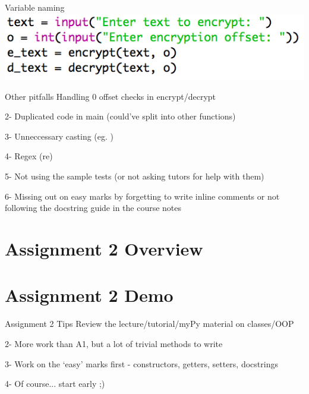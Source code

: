\documentclass[week2]{csse1001}
\begin{document}
\begin{topic}{Variable naming}
\includegraphics[width=\textwidth]{a1pitfalls/vname}
\end{topic}

\begin{topic}{Other pitfalls}
Handling 0 offset checks in encrypt/decrypt

\begin{subtopic}{2-}
Duplicated code in main (could've split into other functions)
\end{subtopic}

\begin{subtopic}{3-}
Unneccessary casting (eg. )
\end{subtopic}

\begin{subtopic}{4-}
Regex (re)
\end{subtopic}

\begin{subtopic}{5-}
Not using the sample tests (or not asking tutors for help with them)
\end{subtopic}

\begin{subtopic}{6-}
Missing out on easy marks by forgetting to write inline comments or not following the docstring guide in the course notes
\end{subtopic}

\end{topic}

\section{Assignment 2 Overview}

\section{Assignment 2 Demo}

\begin{topic}{Assignment 2 Tips}
Review the lecture/tutorial/myPy material on classes/OOP

\begin{subtopic}{2-}
More work than A1, but a lot of trivial methods to write
\end{subtopic}

\begin{subtopic}{3-}
Work on the `easy' marks first - constructors, getters, setters, docstrings
\end{subtopic}

\begin{subtopic}{4-}
Of course... start early ;)
\end{subtopic}
\end{topic}
\end{document}
